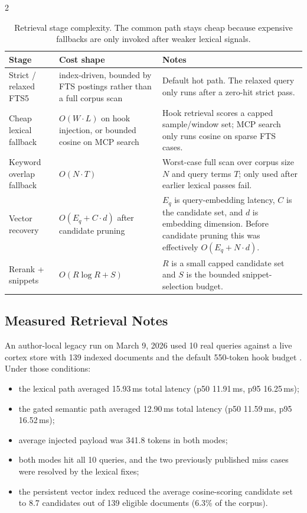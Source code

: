 \documentclass[10pt]{article}
\begin{document}
\begin{multicols}{2}
\begin{table}[h]
\centering
\begin{tabular}{p{3.1cm} p{3.9cm} p{6.2cm}}
\toprule
Stage & Cost shape & Notes \\
\midrule
Strict / relaxed FTS5 & index-driven, bounded by FTS postings rather than a full corpus scan & Default hot path. The relaxed query only runs after a zero-hit strict pass. \\
Cheap lexical fallback & $O(W \cdot L)$ on hook injection, or bounded cosine on MCP search & Hook retrieval scores a capped sample/window set; MCP search only runs cosine on sparse FTS cases. \\
Keyword overlap fallback & $O(N \cdot T)$ & Worst-case full scan over corpus size $N$ and query terms $T$; only used after earlier lexical passes fail. \\
Vector recovery & $O(E_q + C \cdot d)$ after candidate pruning & $E_q$ is query-embedding latency, $C$ is the candidate set, and $d$ is embedding dimension. Before candidate pruning this was effectively $O(E_q + N \cdot d)$. \\
Rerank + snippets & $O(R \log R + S)$ & $R$ is a small capped candidate set and $S$ is the bounded snippet-selection budget. \\
\bottomrule
\end{tabular}
\caption{Retrieval stage complexity. The common path stays cheap because expensive fallbacks are only invoked after weaker lexical signals.}
\end{table}

\subsection{Measured Retrieval Notes}

An author-local legacy run on March 9, 2026 used 10 real queries against a live cortex store with 139 indexed documents and the default 550-token hook budget \cite{cortex-bench}. Under those conditions:
\begin{itemize}
  \item the lexical path averaged 15.93\,ms total latency (p50 11.91\,ms, p95 16.25\,ms);
  \item the gated semantic path averaged 12.90\,ms total latency (p50 11.59\,ms, p95 16.52\,ms);
  \item average injected payload was 341.8 tokens in both modes;
  \item both modes hit all 10 queries, and the two previously published miss cases were resolved by the lexical fixes;
  \item the persistent vector index reduced the average cosine-scoring candidate set to 8.7 candidates out of 139 eligible documents (6.3\% of the corpus).
\end{itemize}


\end{multicols}
\end{document}
